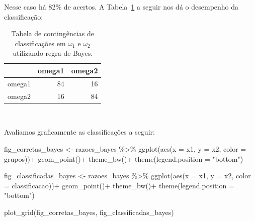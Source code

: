 \documentclass[
  a4paperpaper,
]{article}
\newenvironment{Shaded}{\begin{snugshade}}{\end{snugshade}}
\newcommand{\AttributeTok}[1]{\textcolor[rgb]{0.40,0.45,0.13}{#1}}
\newcommand{\FunctionTok}[1]{\textcolor[rgb]{0.28,0.35,0.67}{#1}}
\newcommand{\NormalTok}[1]{\textcolor[rgb]{0.00,0.23,0.31}{#1}}
\newcommand{\OtherTok}[1]{\textcolor[rgb]{0.00,0.23,0.31}{#1}}
\newcommand{\SpecialCharTok}[1]{\textcolor[rgb]{0.37,0.37,0.37}{#1}}
\newcommand{\StringTok}[1]{\textcolor[rgb]{0.13,0.47,0.30}{#1}}
\begin{document}
Nesse caso há 82\% de acertos. A Tabela~\ref{tbl-acertosverobayes} a
seguir nos dá o desempenho da classificação:

\begin{longtable}[]{@{}lrr@{}}

\caption{\label{tbl-acertosverobayes}Tabela de contingências de
classificações em \(\omega_1\) e \(\omega_2\) utilizando regra de
Bayes.}

\tabularnewline

\toprule\noalign{}
& omega1 & omega2 \\
\midrule\noalign{}
\endhead
\bottomrule\noalign{}
\endlastfoot
omega1 & 84 & 16 \\
omega2 & 16 & 84 \\

\end{longtable}

~

Avaliamos graficamente as classificações a seguir:

\begin{Shaded}
\begin{Highlighting}[]
\NormalTok{fig\_corretas\_bayes }\OtherTok{\textless{}{-}}\NormalTok{ razoes\_bayes }\SpecialCharTok{\%\textgreater{}\%}
  \FunctionTok{ggplot}\NormalTok{(}\FunctionTok{aes}\NormalTok{(}\AttributeTok{x =}\NormalTok{ x1, }\AttributeTok{y =}\NormalTok{ x2, }\AttributeTok{color =}\NormalTok{ grupos))}\SpecialCharTok{+}
  \FunctionTok{geom\_point}\NormalTok{()}\SpecialCharTok{+}
  \FunctionTok{theme\_bw}\NormalTok{()}\SpecialCharTok{+}
  \FunctionTok{theme}\NormalTok{(}\AttributeTok{legend.position =} \StringTok{"bottom"}\NormalTok{)}

\NormalTok{fig\_classificadas\_bayes }\OtherTok{\textless{}{-}}\NormalTok{ razoes\_bayes }\SpecialCharTok{\%\textgreater{}\%}
  \FunctionTok{ggplot}\NormalTok{(}\FunctionTok{aes}\NormalTok{(}\AttributeTok{x =}\NormalTok{ x1, }\AttributeTok{y =}\NormalTok{ x2, }\AttributeTok{color =}\NormalTok{ classificacao))}\SpecialCharTok{+}
  \FunctionTok{geom\_point}\NormalTok{()}\SpecialCharTok{+}
  \FunctionTok{theme\_bw}\NormalTok{()}\SpecialCharTok{+}
  \FunctionTok{theme}\NormalTok{(}\AttributeTok{legend.position =} \StringTok{"bottom"}\NormalTok{)}

\FunctionTok{plot\_grid}\NormalTok{(fig\_corretas\_bayes, fig\_classificadas\_bayes)}
\end{Highlighting}
\end{Shaded}
\end{document}
